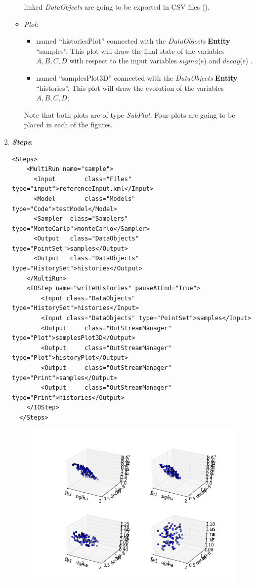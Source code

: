 \begin{enumerate}
\begin{itemize}
      linked  \textit{DataObjects} are going 
    to be exported in CSV files ().
    \item \textit{Plot}: 
    \begin{itemize}
      \item named ``historiesPlot'' connected with the  \textit{DataObjects} 
      \textbf{Entity} ``samples''.  This plot will draw the final state of the
      variables $A,B,C,D$ with respect to the input variables $sigma$(s) 
      and $decay$(s) . 
      \item named ``samplesPlot3D'' connected with the  
      \textit{DataObjects} \textbf{Entity} ``histories''. This plot will draw the 
      evolution of the variables $A,B,C,D$;
    \end{itemize}
     Note that both plots are of type \textit{SubPlot}. Four plots
     are going to be placed in each of the figures.
  \end{itemize}   
   \item \textbf{\textit{Steps}}:   
\begin{lstlisting}[style=XML,morekeywords={arg,extension,pauseAtEnd,overwrite}]
  <Steps>
    <MultiRun name="sample">
      <Input 	    class="Files" 			 type="input">referenceInput.xml</Input>
      <Model 	    class="Models" 		 type="Code">testModel</Model>
      <Sampler 	class="Samplers" 		 type="MonteCarlo">monteCarlo</Sampler>
      <Output 	class="DataObjects"  type="PointSet">samples</Output>
      <Output 	class="DataObjects"  type="HistorySet">histories</Output>
    </MultiRun>
    <IOStep name="writeHistories" pauseAtEnd="True">
        <Input class="DataObjects" type="HistorySet">histories</Input>
        <Input class="DataObjects" type="PointSet">samples</Input>
        <Output 	class="OutStreamManager" type="Plot">samplesPlot3D</Output>
        <Output 	class="OutStreamManager" type="Plot">historyPlot</Output>
        <Output 	class="OutStreamManager" type="Print">samples</Output>
        <Output 	class="OutStreamManager" type="Print">histories</Output>
    </IOStep>
  </Steps>
\end{lstlisting}
 \begin{figure}[h!]
  \centering
  \includegraphics[scale=0.7]{pics/MC_pointsets.png}

\end{figure}
\end{enumerate}
